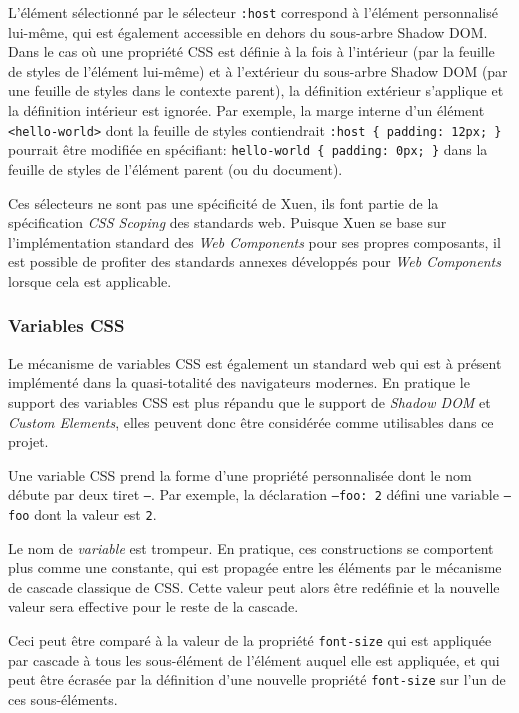 L'élément sélectionné par le sélecteur \texttt{:host} correspond à l'élément personnalisé lui-même, qui est également accessible en dehors du sous-arbre Shadow DOM. Dans le cas où une propriété CSS est définie à la fois à l'intérieur (par la feuille de styles de l'élément lui-même) et à l'extérieur du sous-arbre Shadow DOM (par une feuille de styles dans le contexte parent), la définition extérieur s'applique et la définition intérieur est ignorée. Par exemple, la marge interne d'un élément \texttt{<hello-world>} dont la feuille de styles contiendrait \texttt{:host \{ padding: 12px; \}} pourrait être modifiée en spécifiant: \texttt{hello-world \{ padding: 0px; \}} dans la feuille de styles de l'élément parent (ou du document).

Ces sélecteurs ne sont pas une spécificité de Xuen, ils font partie de la spécification \emph{CSS Scoping} des standards web. Puisque Xuen se base sur l'implémentation standard des \emph{Web Components} pour ses propres composants, il est possible de profiter des standards annexes développés pour \emph{Web Components} lorsque cela est applicable.

\subsubsection{Variables CSS}
Le mécanisme de variables CSS est également un standard web qui est à présent implémenté dans la quasi-totalité des navigateurs modernes. En pratique le support des variables CSS est plus répandu que le support de \emph{Shadow DOM} et \emph{Custom Elements}, elles peuvent donc être considérée comme utilisables dans ce projet.

Une variable CSS prend la forme d'une propriété personnalisée dont le nom débute par deux tiret \texttt{--}. Par exemple, la déclaration \texttt{--foo: 2} défini une variable \texttt{--foo} dont la valeur est \texttt{2}.

Le nom de \emph{variable} est trompeur. En pratique, ces constructions se comportent plus comme une constante, qui est propagée entre les éléments par le mécanisme de cascade classique de CSS. Cette valeur peut alors être redéfinie et la nouvelle valeur sera effective pour le reste de la cascade.

Ceci peut être comparé à la valeur de la propriété \texttt{font-size} qui est appliquée par cascade à tous les sous-élément de l'élément auquel elle est appliquée, et qui peut être écrasée par la définition d'une nouvelle propriété \texttt{font-size} sur l'un de ces sous-éléments.

